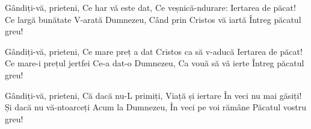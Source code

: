 \beginverse
Gândiți-vă, prieteni,
Ce har vă este dat,
Ce veșnică-ndurare:
Iertarea de păcat!
Ce largă bunătate
V-arată Dumnezeu,
Când prin Cristos vă iartă
Întreg păcatul greu!
\endverse

\beginverse
Gândiți-vă, prieteni,
Ce mare preț a dat
Cristos ca să v-aducă
Iertarea de păcat!
Ce mare-i prețul jertfei
Ce-a dat-o Dumnezeu,
Ca vouă să vă ierte
Întreg păcatul greu!
\endverse

\beginverse
Gândiți-vă, prieteni,
Că dacă nu-L primiți,
Viață și iertare
În veci nu mai găsiți!
Și dacă nu vă-ntoarceți
Acum la Dumnezeu,
În veci pe voi rămâne
Păcatul vostru greu!
\endverse
\endsong